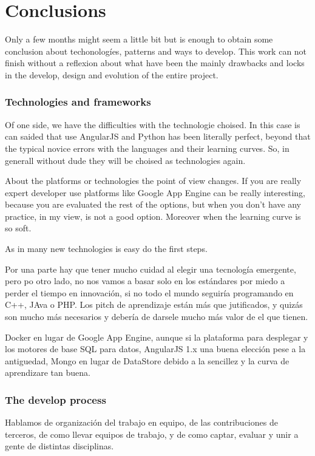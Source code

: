 \chapter{Conclusions}

Only a few months might seem a little bit but  is enough to obtain some
conclusion about techonologíes, patterns and ways to develop.
This work can not finish without a reflexion about what have been the mainly
drawbacks and locks in the develop, design and evolution of the entire project.


\subsection{Technologies and frameworks}

Of one side, we have the difficulties with the technologie choised. In this case
 is can saided that use AngularJS and Python has been literally perfect, beyond
 that the typical novice errors with the languages and their learning curves.
 So, in generall without dude they will be choised as technologies again.

 About the platforms or technologies the point of view changes. If you are
 really expert developer use platforms like Google App Engine can be really
 interesting, because you are evaluated the rest of the options, but when
 you don't have any practice, in my view, is not a good option. Moreover when
 the learning curve is so soft.

 As in many new technologies is easy do the first steps.


 Por una parte hay que tener mucho cuidad al elegir una tecnología emergente,
 pero po otro lado, no nos vamos a basar solo en los estándares por miedo
a perder el tiempo en innovación, si no todo el mundo seguiría programando en
C++, JAva o PHP.
Los pitch de aprendizaje están más que jutificados, y quizás son mucho más necesarios
y debería de darsele mucho más valor de el que tienen.

Docker en lugar de Google App Engine, aunque si la plataforma para desplegar y los motores de base SQL para datos,
AngularJS 1.x una buena elección pese a la antiguedad,  Mongo en lugar de DataStore debido a la
sencillez y la curva de aprendizare tan buena.


\subsection{The develop process}

Hablamos de organización del trabajo en equipo, de las contribuciones de terceros,
de como llevar equipos de trabajo, y de como captar, evaluar y unir a gente de
distintas disciplinas.

